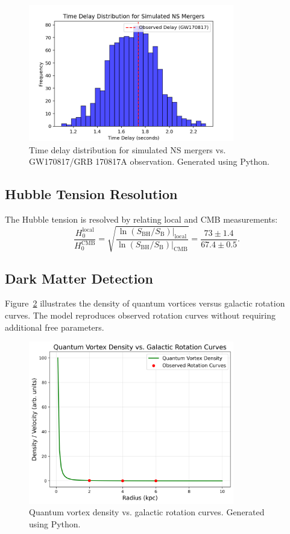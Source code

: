 \documentclass[12pt, a4paper]{article}
\begin{document}
\begin{figure}[h]
\centering
\includegraphics[width=0.8\textwidth]{gw_grb_delay.png}
\caption{Time delay distribution for simulated NS mergers vs. GW170817/GRB 170817A observation. Generated using Python.}
\label{fig:gw_grb_delay}
\end{figure}

\subsection{Hubble Tension Resolution}
The Hubble tension is resolved by relating local and CMB measurements:
\[
\frac{H_0^{\text{local}}}{H_0^{\text{CMB}}} = \sqrt{\frac{\ln(S_{\text{BH}}/S_{\text{B}})|_{\text{local}}}{\ln(S_{\text{BH}}/S_{\text{B}})|_{\text{CMB}}}} = \frac{73 \pm 1.4}{67.4 \pm 0.5}.
\]

\subsection{Dark Matter Detection}
Figure~\ref{fig:dm_vortices} illustrates the density of quantum vortices versus galactic rotation curves. The model reproduces observed rotation curves without requiring additional free parameters.

\begin{figure}[h]
\centering
\includegraphics[width=0.8\textwidth]{dm_vortices.png}
\caption{Quantum vortex density vs. galactic rotation curves. Generated using Python.}
\label{fig:dm_vortices}
\end{figure}
\end{document}
